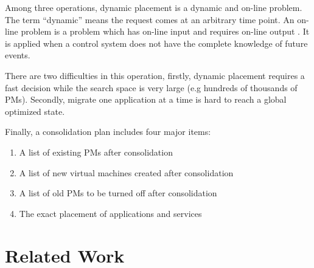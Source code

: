 \begin{enumerate}
	Among three operations, dynamic placement is a dynamic and on-line problem.
	The term ``dynamic'' means the request comes at an arbitrary time point. An on-line problem is a problem which has on-line input and requires on-line output \cite{Borodin:uQcy_H6C}. It is applied when a control system does not have the complete knowledge of future events.

	There are two difficulties in this operation, firstly, dynamic placement requires a fast decision while the search space is very large (e.g hundreds of thousands of PMs). Secondly, migrate one application at a time is hard to reach a global optimized state.

\end{enumerate}

Finally, a consolidation plan includes four major items:
			\begin{enumerate}
				\item A list of existing PMs after consolidation
				\item A list of new virtual machines created after consolidation
				\item A list of old PMs to be turned off after consolidation
				\item The exact placement of applications and services
			\end{enumerate}





\section{Related Work}
